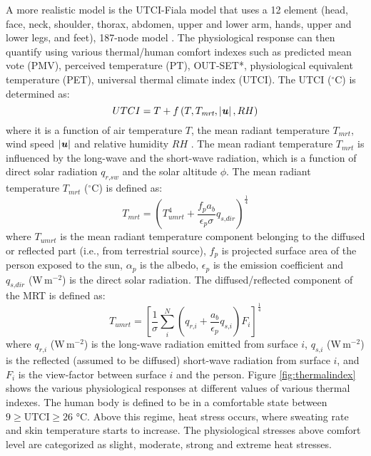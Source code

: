 A more realistic model is the UTCI-Fiala model that uses a 12 element (head, face, neck, shoulder, thorax, abdomen, upper and lower arm, hands, upper and lower legs, and feet), 187-node model \citep{Fiala2001,Brode2012,Blazejczyk2012,Jendritzky2012,Bazejczyk2013,Lokys2015}. The physiological response can then quantify using various thermal/human comfort indexes such as predicted mean vote (PMV), perceived temperature (PT), OUT-SET*, physiological equivalent temperature (PET), universal thermal climate index (UTCI). The UTCI ($^{\circ}$C) is determined as:
\begin{equation}
UTCI = T + f \left(T,{T_{\textit{mrt}}},\left| \textbf{\textit{u}}  \right|,RH\right)
\label{eq:UTCIstate}
\end{equation}
where it is a function of air temperature $T$, the mean radiant temperature $T_{\textit{mrt}}$, wind speed $|\textbf{\textit{u}}|$ and relative humidity $RH$ \citep{Fiala2001,Brode2012,Blazejczyk2012}. The mean radiant temperature $T_{\textit{mrt}}$ is influenced by the long-wave and the short-wave radiation, which is a function of direct solar radiation $q_{\textit{r,sw}}$ and the solar altitude $\phi$. The mean radiant temperature $T_{\textit{mrt}}$ ($^{\circ}$C) is defined as: 
\begin{equation}
T_{\textit{mrt}} = \left( T_{\textit{umrt}}^4  + \frac{f_p a_b}{\epsilon_p \sigma} q_{\textit{s,dir}} \right)^{\frac{1}{4}}
\label{eq:Tmrt}
\end{equation}
where $T_{\textit{umrt}}$ is the mean radiant temperature component belonging to the diffused or reflected part (i.e., from terrestrial source), $f_p$ is projected surface area of the person exposed to the sun, $\alpha_p$ is the albedo, $\epsilon_p$ is the emission coefficient and $q_{\textit{s,dir}}$ (W\,m$^{-2}$) is the direct solar radiation. The diffused/reflected component of the MRT is defined as:
\begin{equation}
T_{\textit{umrt}} = \left[ \frac{1}{\sigma} \sum_{i}^N \left(q_{\textit{r,i}} + \frac{a_b}{\epsilon_p} q_{\textit{s,i}} \right)F_i\right]^{\frac{1}{4}}
\label{eq:Tumrt}
\end{equation}
where $q_{\textit{r,i}}$ (W\,m$^{-2}$)  is the long-wave radiation emitted from surface $i$, $q_{\textit{s,i}}$ (W\,m$^{-2}$) is the reflected (assumed to be diffused) short-wave radiation from surface $i$, and $F_i$ is the view-factor between surface $i$ and the person. Figure \ref{fig:thermalindex} shows the various physiological responses at different values of various thermal indexes. The human body is defined to be in a comfortable state between $9\ge \mathrm{UTCI} \ge 26$ \si{\celsius}. Above this regime, heat stress occurs, where sweating rate and skin temperature starts to increase. The physiological stresses above comfort level are categorized as slight, moderate, strong and extreme heat stresses.

